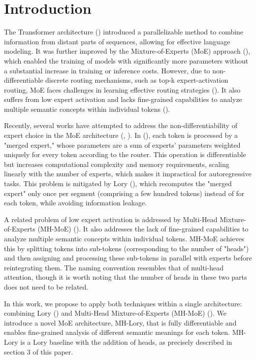 \documentclass[12pt]{article}
\begin{document}
\section{Introduction}
The Transformer architecture (\cite{vaswani2017attention}) introduced a parallelizable method to combine information from distant parts of sequences, allowing for effective language modeling. It was further improved by the Mixture-of-Experts (MoE) approach (\cite{shazeer2017outrageously}), which enabled the training of models with significantly more parameters without a substantial increase in training or inference costs. However, due to non-differentiable discrete routing mechanisms, such as top-k expert-activation routing, MoE faces challenges in learning effective routing strategies (\cite{muqeeth2023soft}). It also suffers from low expert activation and lacks fine-grained capabilities to analyze multiple semantic concepts within individual tokens (\cite{wu2024multihead}).

Recently, several works have attempted to address the non-differentiability of expert choice in the MoE architecture (\cite{Puigcerver2023FromST}, \cite{muqeeth2023soft}). In (\cite{muqeeth2023soft}), each token is processed by a "merged expert," whose parameters are a sum of experts' parameters weighted uniquely for every token according to the router. This operation is differentiable but increases computational complexity and memory requirements, scaling linearly with the number of experts, which makes it impractical for autoregressive tasks. This problem is mitigated by Lory (\cite{zhong2024lory}), which recomputes the "merged expert" only once per segment (comprising a few hundred tokens) instead of for each token, while avoiding information leakage.

A related problem of low expert activation is addressed by Multi-Head Mixture-of-Experts (MH-MoE) (\cite{wu2024multihead}). It also addresses the lack of fine-grained capabilities to analyze multiple semantic concepts within individual tokens. MH-MoE achieves this by splitting tokens into sub-tokens (corresponding to the number of "heads") and then assigning and processing these sub-tokens in parallel with experts before reintegrating them. The naming convention resembles that of multi-head attention, though it is worth noting that the number of heads in these two parts does not need to be related.

In this work, we propose to apply both techniques within a single architecture: combining Lory (\cite{zhong2024lory}) and Multi-Head Mixture-of-Experts (MH-MoE) (\cite{wu2024multihead}). We introduce a novel MoE architecture, MH-Lory, that is fully differentiable and enables fine-grained analysis of different semantic meanings for each token. MH-Lory is a Lory baseline with the addition of heads, as precisely described in section 3 of this paper.
\end{document}

